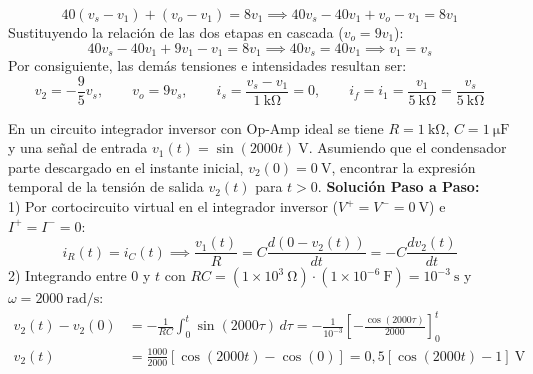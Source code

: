 \begin{ejercicio}
\begin{equation}
    40 (v_s - v_1) + (v_o - v_1) = 8 v_1 \implies 40 v_s - 40 v_1 + v_o - v_1 = 8 v_1
\end{equation}
Sustituyendo la relación de las dos etapas en cascada ($v_o = 9 v_1$):
\begin{equation}
    40 v_s - 40 v_1 + 9 v_1 - v_1 = 8 v_1 \implies 40 v_s = 40 v_1 \implies \boxed{v_1 = v_s}
\end{equation}
Por consiguiente, las demás tensiones e intensidades resultan ser:
\begin{equation}
    \boxed{v_2 = -\frac{9}{5} v_s, \qquad v_o = 9 v_s, \qquad i_s = \frac{v_s - v_1}{1\ \si{\kilo\ohm}} = 0, \qquad i_f = i_1 = \frac{v_1}{5\ \si{\kilo\ohm}} = \frac{v_s}{5\ \si{\kilo\ohm}}}
\end{equation}
\end{ejercicio}

\begin{ejercicio}
En un circuito integrador inversor con Op-Amp ideal se tiene $R = 1\ \si{\kilo\ohm}$, $C = 1\ \si{\micro\farad}$ y una señal de entrada $v_1(t) = \sin(2000t)\ \si{\volt}$. Asumiendo que el condensador parte descargado en el instante inicial, $v_2(0) = 0\ \si{\volt}$, encontrar la expresión temporal de la tensión de salida $v_2(t)$ para $t > 0$.
\tcbline
\textbf{Solución Paso a Paso:}\\[4pt]
1) Por cortocircuito virtual en el integrador inversor ($V^+ = V^- = 0\ \si{\volt}$) e $I^+ = I^- = 0$:
\begin{equation}
    i_R(t) = i_C(t) \implies \frac{v_1(t)}{R} = C \frac{d(0 - v_2(t))}{dt} = -C \frac{dv_2(t)}{dt}
\end{equation}
2) Integrando entre $0$ y $t$ con $R C = (1 \times 10^3\ \si{\ohm}) \cdot (1 \times 10^{-6}\ \si{\farad}) = 10^{-3}\ \si{\second}$ y $\omega = 2000\ \si{\radian\per\second}$:
\begin{align}
    v_2(t) - v_2(0) &= -\frac{1}{R C} \int_0^t \sin(2000\tau)\, d\tau = -\frac{1}{10^{-3}} \left[-\frac{\cos(2000\tau)}{2000}\right]_0^t \\
    v_2(t) &= \frac{1000}{2000} \left[\cos(2000t) - \cos(0)\right] = \boxed{0{,}5 \left[\cos(2000t) - 1\right]\ \si{\volt}}
\end{align}
\end{ejercicio}

